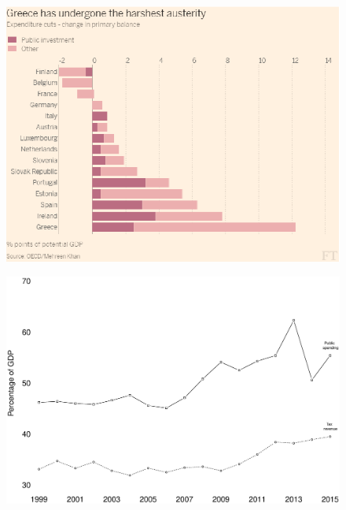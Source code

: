 \documentclass{beamer}
\begin{document}
\begin{frame}
  \begin{figure}
    \includegraphics[scale=.3]{austerity.eps}
  \end{figure}
\end{frame}

\begin{frame}
  \begin{figure}
    \includegraphics[scale=.3]{greece3.eps}
  \end{figure}
\end{frame}
\end{document}
